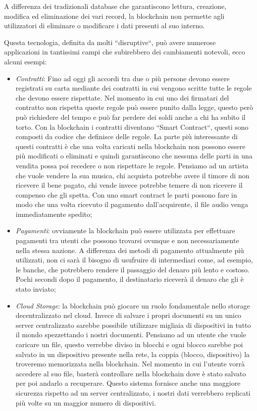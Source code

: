 \documentclass[12pt]{report}
\begin{document}
A differenza dei tradizionali database che garantiscono lettura, creazione, modifica ed eliminazione dei vari record, la blockchain non permette agli utilizzatori di eliminare o modificare i dati presenti al suo interno.

Questa tecnologia, definita da molti ``disruptive``, può avere numerose applicazioni in tantissimi campi che subirebbero dei cambiamenti notevoli, ecco alcuni esempi:

\begin{itemize}
\item \textit{Contratti}: Fino ad oggi gli accordi tra due o più persone devono essere registrati su carta mediante dei contratti in cui vengono scritte tutte le regole che devono essere rispettate. 
Nel momento in cui uno dei firmatari del contratto non rispetta queste regole può essere punito dalla legge, questo però può richiedere del tempo e può far perdere dei soldi anche a chi ha subito il torto.
Con la blockchain i contratti diventano ``Smart Contract``, questi sono composti da codice che definisce delle regole.
La parte più interessante di questi contratti è che una volta caricati nella blockchain non possono essere più modificati o eliminati e quindi garantiscono che nessuna delle parti in una vendita possa poi recedere o non rispettare le regole.
Pensiamo ad un artista che vuole vendere la sua musica, chi acquista potrebbe avere il timore di non ricevere il bene pagato, chi vende invece potrebbe temere di non ricevere il compenso che gli spetta.
Con uno smart contract le parti possono fare in modo che una volta ricevuto il pagamento dall'acquirente, il file audio venga immediatamente spedito;
\item \textit{Pagamenti}: ovviamente la blockchain può essere utilizzata per effettuare pagamenti tra utenti che possono trovarsi ovunque e non necessariamente nella stessa nazione.
A differenza dei metodi di pagamento attualmente più utilizzati, non ci sarà il bisogno di usufruire di intermediari come, ad esempio, le banche, che potrebbero rendere il passaggio del denaro più lento e costoso.
Pochi secondi dopo il pagamento, il destinatario riceverà il denaro che gli è stato inviato;
\item \textit{Cloud Storage}: la blockchain può giocare un ruolo fondamentale nello storage decentralizzato nel cloud. Invece di salvare i propri documenti su un unico server centralizzato sarebbe possibile utilizzare migliaia di dispositivi in tutto il mondo spezzettando i nostri documenti.
Pensiamo ad un utente che vuole caricare un file, questo verrebbe diviso in blocchi e ogni blocco sarebbe poi salvato in un dispositivo presente nella rete, la coppia (blocco, dispositivo) la troveremo memorizzata nella blockchain. Nel momento in cui l'utente vorrà accedere al suo file, basterà controllare nella blockchain dove è stato salvato per poi andarlo a recuperare.
Questo sistema fornisce anche una maggiore sicurezza rispetto ad un server centralizzato, i nostri dati verrebbero replicati più volte su un maggior numero di dispositivi.

\end{itemize}
\end{document}
